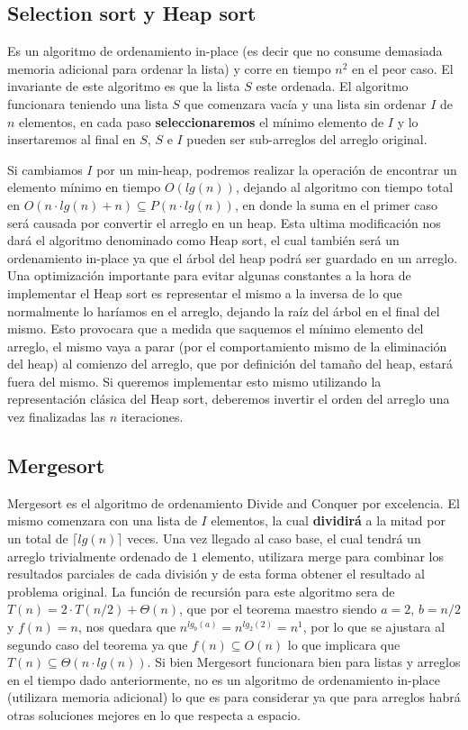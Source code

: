 \subsection{Selection sort y Heap sort}

Es un algoritmo de ordenamiento in-place (es decir que no consume demasiada memoria adicional para ordenar la lista) y corre en tiempo $n^2$ en el peor caso. El invariante de este algoritmo es que la lista $S$ este ordenada. El algoritmo funcionara teniendo una lista $S$ que comenzara vac\'ia y una lista sin ordenar $I$ de $n$ elementos, en cada paso \textbf{seleccionaremos} el m\'inimo elemento de $I$ y lo insertaremos al final en $S$, $S$ e $I$ pueden ser sub-arreglos del arreglo original.

Si cambiamos $I$ por un min-heap, podremos realizar la operaci\'on de encontrar un elemento m\'inimo en tiempo $O(lg(n))$, dejando al algoritmo con tiempo total en $O(n\cdot lg(n) + n) \subseteq P(n\cdot lg(n))$, en donde la suma en el primer caso ser\'a causada por convertir el arreglo en un heap. Esta ultima modificaci\'on nos dar\'a el algoritmo denominado como Heap sort, el cual tambi\'en ser\'a un ordenamiento in-place ya que el \'arbol del heap podr\'a ser guardado en un arreglo. Una optimizaci\'on importante para evitar algunas constantes a la hora de implementar el Heap sort es representar el mismo a la inversa de lo que normalmente lo har\'iamos en el arreglo, dejando la ra\'iz del \'arbol en el final del mismo. Esto provocara que a medida que saquemos el m\'inimo elemento del arreglo, el mismo vaya a parar (por el comportamiento mismo de la eliminaci\'on del heap) al comienzo del arreglo, que por definici\'on del tama\~no del heap, estar\'a fuera del mismo. Si queremos implementar esto mismo
utilizando la representaci\'on cl\'asica del Heap sort, deberemos invertir el orden del arreglo una vez finalizadas las $n$ iteraciones.

\subsection{Mergesort}

Mergesort es el algoritmo de ordenamiento Divide and Conquer por excelencia. El mismo comenzara con una lista de $I$ elementos, la cual \textbf{dividir\'a} a la mitad por un total de $\lceil lg(n) \rceil$ veces. Una vez llegado al caso base, el cual tendr\'a un arreglo trivialmente ordenado de $1$ elemento, utilizara merge para combinar los resultados parciales de cada divisi\'on y de esta forma obtener el resultado al problema original. La funci\'on de recursi\'on para este algoritmo sera de $T(n) = 2 \cdot T(n/2) + \Theta(n)$, que por el teorema maestro siendo $a=2$, $b=n/2$ y $f(n) = n$, nos quedara que $n^{lg_b(a)} = n^{lg_2(2)} = n^1$, por lo que se ajustara al segundo caso del teorema ya que $f(n) \subseteq O(n)$ lo que implicara que $T(n) \subseteq \Theta(n \cdot lg(n))$. Si bien Mergesort funcionara bien para listas y arreglos en el tiempo dado anteriormente, no es un algoritmo de ordenamiento in-place (utilizara memoria adicional) lo que es para considerar ya que para arreglos habr\'a otras soluciones mejores en lo que respecta a espacio.

